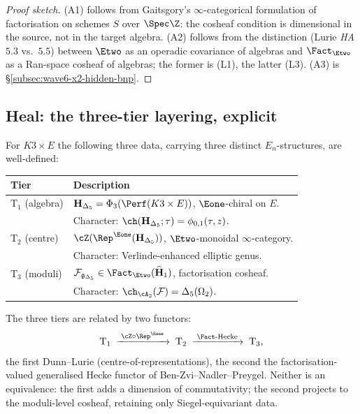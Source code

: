 \begin{proof}[Proof sketch]
(A1) follows from Gaitsgory's $\infty$-categorical formulation
of factorisation on schemes $S$ over $\Spec \Z$: the cosheaf
condition is dimensional in the source, not in the target
algebra. (A2) follows from the distinction (Lurie \emph{HA}
$5.3$ vs.\ $5.5$) between $\Etwo$ as an operadic covariance of
algebras and $\Fact_{\Etwo}$ as a Ran-space cosheaf of
algebras; the former is (L1), the latter (L3). (A3) is
\S\ref{subsec:wave6-x2-hidden-bnp}.
\end{proof}

\subsection{Heal: the three-tier layering, explicit}
\label{subsec:wave6-x2-heal-layering}

\begin{definition}[Three-tier $E_n$-carrier data at
$(g, d, N) = (2, 3, \infty)$]
\label{def:three-tier-en-carrier}
For $K3 \times E$ the following three data, carrying three
distinct $E_n$-structures, are well-defined:
\begin{center}
\renewcommand{\arraystretch}{1.3}
\begin{tabular}{ll}
\toprule
\textbf{Tier} & \textbf{Description} \\
\midrule
$\mathrm T_1$ (algebra) & $\mathbf H_{\Delta_5} =
\Phi_3(\Perf(K3 \times E))$, $\Eone$-chiral on $E$. \\
 & Character:
$\ch(\mathbf H_{\Delta_5}; \tau) = \phi_{0, 1}(\tau, z)$. \\
$\mathrm T_2$ (centre) &
$\cZ(\Rep^{\Eone}(\mathbf H_{\Delta_5}))$,
$\Etwo$-monoidal $\infty$-category. \\
 & Character: Verlinde-enhanced elliptic genus. \\
$\mathrm T_3$ (moduli) &
$\mathcal F_{\mathfrak g_{\Delta_5}} \in
\Fact_{\Etwo}(\widehat{\mathbf H}_1)$, factorisation cosheaf. \\
 & Character:
$\ch_{\cA_2}(\mathcal F) = \Delta_5(\Omega_2)$. \\
\bottomrule
\end{tabular}
\end{center}
\end{definition}

The three tiers are related by two functors:
\begin{equation*}
\mathrm T_1 \;\xrightarrow{\;\cZ \circ \Rep^{\Eone}\;}\;
\mathrm T_2 \;\xrightarrow{\;\Fact\text{-Hecke}\;}\;
\mathrm T_3,
\end{equation*}
the first Dunn--Lurie (centre-of-representations), the second
the factorisation-valued generalised Hecke functor of
Ben-Zvi--Nadler--Preygel. Neither is an equivalence: the first
adds a dimension of commutativity; the second projects to the
moduli-level cosheaf, retaining only Siegel-equivariant data.

